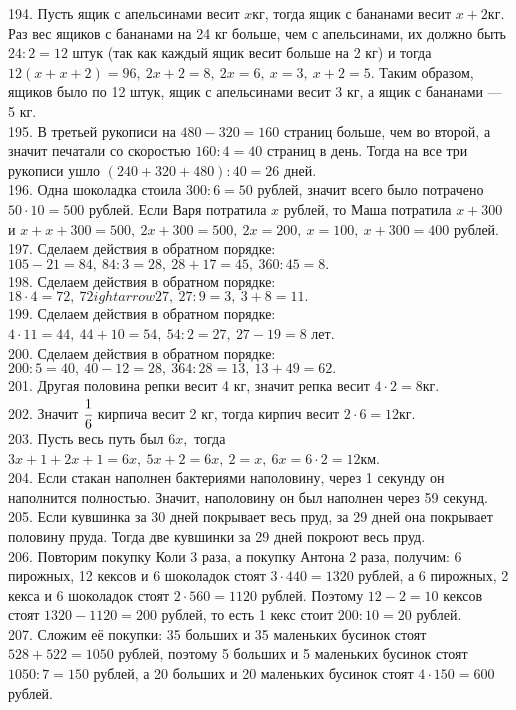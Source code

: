 194. Пусть ящик с апельсинами весит $x$кг, тогда ящик с бананами весит $x+2$кг. Раз вес ящиков с бананами на 24 кг больше, чем с апельсинами, их должно быть $24:2=12$ штук (так как каждый ящик весит больше на 2 кг) и тогда $12(x+x+2)=96,\ 2x+2=8,\ 2x=6,\ x=3,\ x+2=5.$ Таким образом, ящиков было по 12 штук, ящик с апельсинами весит 3 кг, а ящик с бананами --- 5 кг.\\
195. В третьей рукописи на $480-320=160$ страниц больше, чем во второй, а значит печатали со скоростью $160:4=40$ страниц в день. Тогда на все три рукописи ушло $(240+320+480):40=26$ дней.\\
196. Одна шоколадка стоила $300:6=50$ рублей, значит всего было потрачено $50\cdot10=500$ рублей. Если Варя потратила $x$ рублей, то Маша потратила $x+300$ и $x+x+300=500,\ 2x+300=500,\ 2x=200,\ x=100,\ x+300=400$ рублей.\\
197. Сделаем действия в обратном порядке: $105-21=84,\ 84:3=28,\ 28+17=45,\ 360:45=8.$\\
198. Сделаем действия в обратном порядке: $18\cdot4=72,\ 72
ightarrow27,\ 27:9=3,\ 3+8=11.$\\
199. Сделаем действия в обратном порядке: $4\cdot11=44,\ 44+10=54,\ 54:2=27,\ 27-19=8$ лет.\\
200. Сделаем действия в обратном порядке: $200:5=40,\ 40-12=28,\ 364:28=13,\ 13+49=62.$\\
201. Другая половина репки весит 4 кг, значит репка весит $4\cdot2=8$кг.\\
202. Значит $\cfrac{1}{6}$ кирпича весит 2 кг, тогда кирпич весит $2\cdot6=12$кг.\\
203. Пусть весь путь был $6x,$ тогда $3x+1+2x+1=6x,\ 5x+2=6x,\ 2=x,\ 6x=6\cdot2=12$км.\\
204. Если стакан наполнен бактериями наполовину, через 1 секунду он наполнится полностью. Значит, наполовину он был наполнен через 59 секунд.\\
205. Если кувшинка за 30 дней покрывает весь пруд, за 29 дней она покрывает половину пруда. Тогда две кувшинки за 29 дней покроют весь пруд.\\
206. Повторим покупку Коли 3 раза, а покупку Антона 2 раза, получим: 6 пирожных, 12 кексов и 6 шоколадок стоят $3\cdot440=1320$ рублей, а 6 пирожных, 2 кекса и 6 шоколадок стоят $2\cdot560=1120$ рублей. Поэтому $12-2=10$ кексов стоят $1320-1120=200$ рублей, то есть 1 кекс стоит $200:10=20$ рублей.\\
207. Сложим её покупки: 35 больших и 35 маленьких бусинок стоят $528+522=1050$ рублей, поэтому 5 больших и 5 маленьких бусинок стоят $1050:7=150$ рублей, а 20 больших и 20 маленьких бусинок стоят $4\cdot150=600$ рублей.\\
